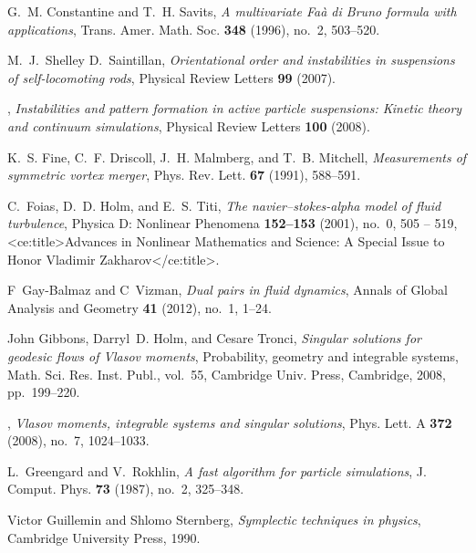 \documentclass[12pt]{amsart}
\theoremstyle{remark}
\begin{document}
\begin{thebibliography}{FDMM91}
G.~M. Constantine and T.~H. Savits, \emph{A multivariate {F}a\`a di {B}runo
  formula with applications}, Trans. Amer. Math. Soc. \textbf{348} (1996),
  no.~2, 503--520. 

M.~J.~Shelley D.~Saintillan, \emph{Orientational order and instabilities in
  suspensions of self-locomoting rods}, Physical Review Letters \textbf{99}
  (2007).

\bysame, \emph{Instabilities and pattern formation in active particle
  suspensions: Kinetic theory and continuum simulations}, Physical Review
  Letters \textbf{100} (2008).

K.~S. Fine, C.~F. Driscoll, J.~H. Malmberg, and T.~B. Mitchell,
  \emph{Measurements of symmetric vortex merger}, Phys. Rev. Lett. \textbf{67}
  (1991), 588--591.

C.~Foias, D.~D. Holm, and E.~S. Titi, \emph{The navier--stokes-alpha model of
  fluid turbulence}, Physica D: Nonlinear Phenomena \textbf{152--153} (2001),
  no.~0, 505 -- 519, <ce:title>Advances in Nonlinear Mathematics and Science: A
  Special Issue to Honor Vladimir Zakharov</ce:title>.

F~Gay-Balmaz and C~Vizman, \emph{Dual pairs in fluid dynamics}, Annals of
  Global Analysis and Geometry \textbf{41} (2012), no.~1, 1--24.

John Gibbons, Darryl~D. Holm, and Cesare Tronci, \emph{Singular solutions for
  geodesic flows of {V}lasov moments}, Probability, geometry and integrable
  systems, Math. Sci. Res. Inst. Publ., vol.~55, Cambridge Univ. Press,
  Cambridge, 2008, pp.~199--220. 

\bysame, \emph{Vlasov moments, integrable systems and singular solutions},
  Phys. Lett. A \textbf{372} (2008), no.~7, 1024--1033. 

L.~Greengard and V.~Rokhlin, \emph{A fast algorithm for particle simulations},
  J. Comput. Phys. \textbf{73} (1987), no.~2, 325--348. 

Victor Guillemin and Shlomo Sternberg, \emph{Symplectic techniques in physics},
  Cambridge University Press, 1990.


\end{thebibliography}
\end{document}
